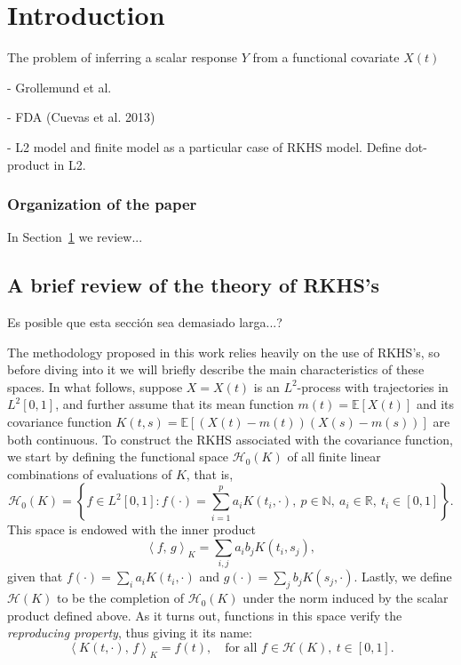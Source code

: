 \documentclass[ba]{imsart}
\numberwithin{equation}{section}
\theoremstyle{plain}
\newcommand{\N}{\mathbb{N}}
\newcommand{\R}{\mathbb{R}}
\newcommand\dotprod[2]{\left\langle #1,\, #2 \right\rangle}
\newenvironment{comment}
{
\noindent \em \color{red}
}
{
\color{black}
}
\begin{document}
\section{Introduction}\label{sec:intro}

The problem of inferring a scalar response \(Y\) from a functional covariate \(X(t)\)

\begin{comment}
  - Grollemund et al.

  - FDA (Cuevas et al. 2013)

  - L2 model and finite model as a particular case of RKHS model. Define dot-product in L2.
\end{comment}

\subsubsection{Organization of the paper}

In Section~\ref{sec:intro} we review...

\subsection{A brief review of the theory of RKHS's}

\begin{comment}
  Es posible que esta sección sea demasiado larga...?
\end{comment}

The methodology proposed in this work relies heavily on the use of RKHS's, so before diving into it we will briefly describe the main characteristics of these spaces. In what follows, suppose \(X=X(t)\) is an \(L^2\)-process with trajectories in \(L^2[0,1]\), and further assume that its mean function \(m(t)=\mathbb E[X(t)]\) and its covariance function \(K(t, s)= \mathbb E[(X(t) - m(t))(X(s) - m(s))]\) are both continuous. To construct the RKHS associated with the covariance function, we start by defining the functional space \(\mathcal H_0(K)\) of all finite linear combinations of evaluations of \(K\), that is,
\[
\mathcal H_0(K) = \left\{ f \in L^2[0,1]: f(\cdot) = \sum_{i=1}^p a_i K(t_i, \cdot), \ p \in \N, \ a_i \in \R, \ t_i \in [0, 1] \right\}.
\]
This space is endowed with the inner product
\[
\dotprod{f}{g}_K = \sum_{i, j} a_i b_j K(t_i, s_j),
\]
given that \(f(\cdot)=\sum_i a_i K(t_i, \cdot) \) and \(g(\cdot)=\sum_j b_j K(s_j, \cdot)\). Lastly, we define \(\mathcal H(K)\) to be the completion of \(\mathcal H_0(K)\) under the norm induced by the scalar product defined above. As it turns out, functions in this space verify the \textit{reproducing property}, thus giving it its name:
\begin{equation}\label{eq:reproducing-property}
  \dotprod{K(t, \cdot)}{f}_K = f(t), \quad \text{for all } f \in \mathcal H(K), \ t \in [0, 1].
\end{equation}
\end{document}
